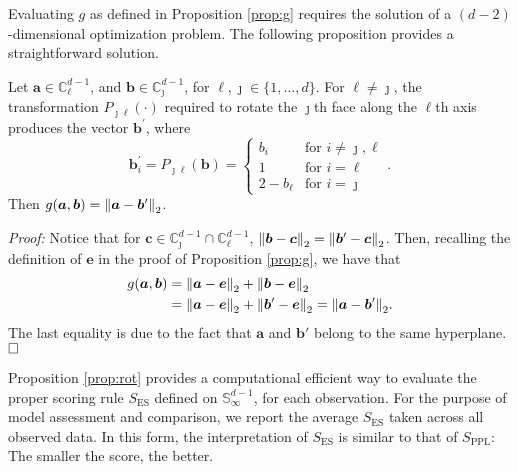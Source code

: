 Evaluating $g$ as defined in Proposition \ref{prop:g} requires the solution of a $(d-2)$-dimensional 
  optimization problem.  The following proposition provides a straightforward solution.
\begin{prop}\label{prop:rot}
    Let $\bm{a} \in {\mathbb C}_{\ell}^{d-1}$, and $\bm{b} \in {\mathbb C}_{\jmath}^{d-1}$, for $\ell, \jmath \in \{1, \ldots , d\}$.  For $\ell\neq \jmath$, the 
  transformation $P_{\jmath\ell}(\cdot)$ required to rotate the $\jmath$th face along the $\ell$th axis 
  produces the vector $\bm{b}^\prime$, where
  \begin{equation}
    \label{eqn:rotation}
     \bm{b}^{\prime}_i = P_{\jmath\ell}(\bm{b}) = 
    \begin{cases}
        b_{i} &\text{for }i\neq \jmath,\ell\\
        1 &\text{for }i = \ell\\
        2 - b_{\ell} &\text{for }i = \jmath
    \end{cases}.
  \end{equation}
  Then $g(\bm{a},\bm{b}) = \pnorm{\bm{a} - \bm{b}^{\prime}}{2}$.
\end{prop}
{\em Proof:}
Notice that for 
  $\bm{c} \in {\mathbb C}_{\jmath}^{d-1}\cap{\mathbb C}_{\ell}^{d-1}$,
     $\pnorm{\bm{b} - \bm{c}}{2} =  \pnorm{\bm{b}^{\prime} - \bm{c}}{2}$. Then, recalling the definition of 
     $\bm{e}$ in the proof of Proposition \ref{prop:g}, we have that
  \begin{equation*}
    \begin{aligned}
    g(\bm{a}, \bm{b}) &= \pnorm{\bm{a} - \bm{e}}{2} + \pnorm{\bm{b} - \bm{e}}{2}\\
    &= \pnorm{\bm{a} - \bm{e}}{2} + \pnorm{\bm{b}^{\prime} - \bm{e}}{2} = \pnorm{\bm{a} - \bm{b}^{\prime}}{2}.
    \end{aligned}
  \end{equation*}
  The last equality is due to the fact that $\bm{a}$ and $\bm{b}'$ belong to the same hyperplane.
  $\hfill\Box$

Proposition \ref{prop:rot} provides a computational efficient way to evaluate the proper scoring rule $S_{\text{ES}}$ defined on ${\mathbb S}_\infty^{d-1}$, for each observation. For the purpose of model assessment and comparison, we report the average $S_{\text{ES}}$ taken across all observed data.  In this form, the interpretation of $S_{\text{ES}}$ is similar to that of $S_{\text{PPL}}$: The smaller the score, the better.
